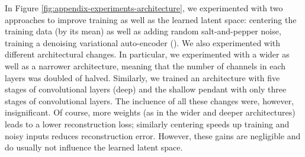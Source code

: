 In Figure \ref{fig:appendix-experiments-architecture}, we experimented
with two approaches to improve training as well as the learned latent space:
centering the training data (by its mean) as well as adding random
salt-and-pepper noise, \ie training a denoising variational auto-encoder (\DVAE).
We also experimented with different architectural changes. In particular,
we experimented with a wider as well as a narrower architecture, meaning that
the number of channels in each layers was doubled of halved. Similarly, we trained
an architecture with five stages of convolutional layers (deep) and the
shallow pendant with only three stages of convolutional layers. The incluence
of all these changes were, however, insignificant. Of course, more weights
(as \ie in the wider and deeper architectures) leads to a lower reconstruction
loss; similarly centering speeds up training and noisy inputs reduces
reconstruction error. However, these gains are negligible and do usually not
influence the learned latent space.

